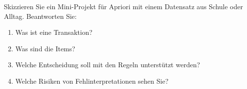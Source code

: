 \begin{mychallenge}
Skizzieren Sie ein Mini-Projekt für Apriori mit einem Datensatz aus Schule oder Alltag.
Beantworten Sie:
\begin{enumerate}
    \item Was ist eine Transaktion?
    \item Was sind die Items?
    \item Welche Entscheidung soll mit den Regeln unterstützt werden?
    \item Welche Risiken von Fehlinterpretationen sehen Sie?
\end{enumerate}
\end{mychallenge}
